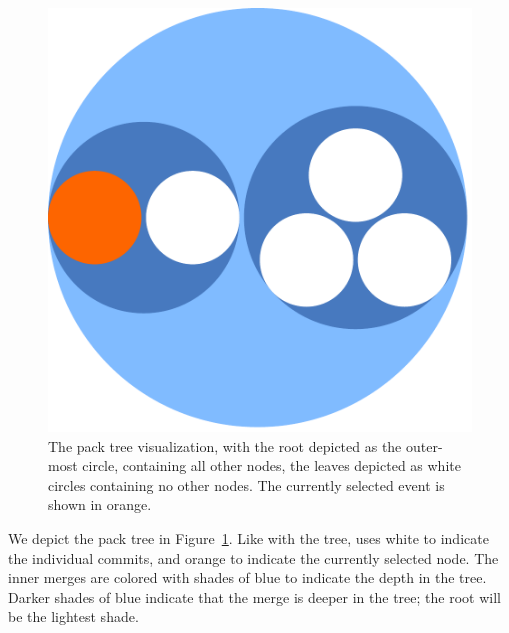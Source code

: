 \begin{figure}[htpb]
  \centering
  \includegraphics[width=0.8\linewidth]{figures/linvis/linvis_bubble.pdf}
  \caption{The pack tree visualization, with the root depicted as the
    outer-most circle, containing all other nodes, the leaves depicted
    as white circles containing no other nodes. The currently selected
    event is shown in orange.}
  \label{fig:linvis_pack}
\end{figure}

We depict the pack tree in Figure~\ref{fig:linvis_pack}. Like with the
\rt tree, \tool uses white to indicate the individual commits, and
orange to indicate the currently selected node. The inner merges are
colored with shades of blue to indicate the depth in the tree. Darker
shades of blue indicate that the merge is deeper in the tree; the root
will be the lightest shade.
